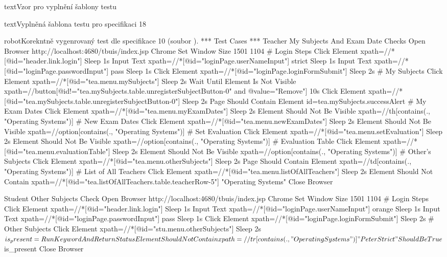 \documentclass[czech, ma, kiv, he, iso690numb, pdf, viewonly]{fasthesis}
\begin{document}
\begin{code}{text}{Vzor pro vyplnění šablony testu \label{lst:template}}
{\begin{code}{text}{Vyplněná šablona testu pro specifikaci 18 \label{lst:spec18}}
{\begin{code}{robot}{Korekntně vygenrovaný test dle specifikace 10 (soubor ). \label{lst:gpt4:spec-10-3}}
*** Test Cases ***
Teacher My Subjects And Exam Date Checks
    Open Browser    http://localhost:4680/tbuis/index.jsp    Chrome
    Set Window Size    1501    1104
    # Login Steps
    Click Element    xpath=//*[@id="header.link.login"]
    Sleep    1s
    Input Text    xpath=//*[@id="loginPage.userNameInput"]    strict
    Sleep    1s
    Input Text    xpath=//*[@id="loginPage.passwordInput"]    pass
    Sleep    1s
    Click Element    xpath=//*[@id="loginPage.loginFormSubmit"]
    Sleep    2s
    # My Subjects
    Click Element    xpath=//*[@id="tea.menu.mySubjects"]
    Sleep    2s
    Wait Until Element Is Not Visible    xpath=//button[@id!="tea.mySubjects.table.unregisterSubjectButton-0" and @value="Remove"]    10s
    Click Element    xpath=//*[@id="tea.mySubjects.table.unregisterSubjectButton-0"]
    Sleep    2s
    Page Should Contain Element    id=tea.mySubjects.successAlert
    # My Exam Dates
    Click Element    xpath=//*[@id="tea.menu.myExamDates"]
    Sleep    2s
    Element Should Not Be Visible    xpath=//th[contains(., "Operating Systems")]
    # New Exam Dates
    Click Element    xpath=//*[@id="tea.menu.newExamDates"]
    Sleep    2s
    Element Should Not Be Visible    xpath=//option[contains(., "Operating Systems")]
    # Set Evaluation
    Click Element    xpath=//*[@id="tea.menu.setEvaluation"]
    Sleep    2s
    Element Should Not Be Visible    xpath=//option[contains(., "Operating Systems")]
    # Evaluation Table
    Click Element    xpath=//*[@id="tea.menu.evaluationTable"]
    Sleep    2s
    Element Should Not Be Visible    xpath=//option[contains(., "Operating Systems")]
    # Other's Subjects
    Click Element    xpath=//*[@id="tea.menu.otherSubjects"]
    Sleep    2s
    Page Should Contain Element    xpath=//td[contains(., "Operating Systems")]
    # List of All Teachers
    Click Element    xpath=//*[@id="tea.menu.listOfAllTeachers"]
    Sleep    2s
    Element Should Not Contain    xpath=//*[@id="tea.listOfAllTeachers.table.teacherRow-5"]    "Operating Systems"
    Close Browser

Student Other Subjects Check
    Open Browser    http://localhost:4680/tbuis/index.jsp    Chrome
    Set Window Size    1501    1104
    # Login Steps
    Click Element    xpath=//*[@id="header.link.login"]
    Sleep    1s
    Input Text    xpath=//*[@id="loginPage.userNameInput"]    orange
    Sleep    1s
    Input Text    xpath=//*[@id="loginPage.passwordInput"]    pass
    Sleep    1s
    Click Element    xpath=//*[@id="loginPage.loginFormSubmit"]
    Sleep    2s
    # Other Subjects
    Click Element    xpath=//*[@id="stu.menu.otherSubjects"]
    Sleep    2s
    ${is_present}=    Run Keyword And Return Status    Element Should Not Contain    xpath=//tr[contains(., "Operating Systems")]    "Peter Strict"
    Should Be True    ${is_present}
    Close Browser\end{code}

}
\end{code}}
\end{code}
\end{document}
